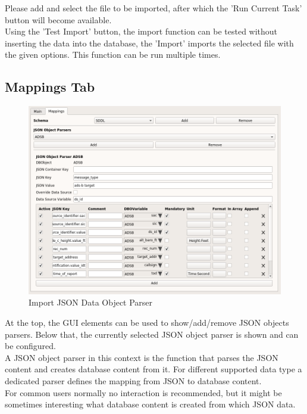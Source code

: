Please add and select the file to be imported, after which the 'Run Current Task' button will become available. \\

Using the 'Test Import' button, the import function can be tested without inserting the data into the 
database, the 'Import' imports the selected file with the given options. This function can be run multiple times. \\

\subsection{Mappings Tab}

\begin{figure}[H]
  \center
    \includegraphics[width=16cm,frame]{../screenshots/import_json_data_object_parser.png}
  \caption{Import JSON Data Object Parser}
\end{figure}

At the top, the GUI elements can be used to show/add/remove JSON objects parsers. Below that, the currently selected JSON object parser is shown and can be configured. \\

A JSON object parser in this context is the function that parses the JSON content and creates database content from it. For different supported  data type a dedicated parser defines the mapping from JSON to database content. \\

For common users normally no interaction is recommended, but it might be sometimes interesting what database content is created from which JSON data.

